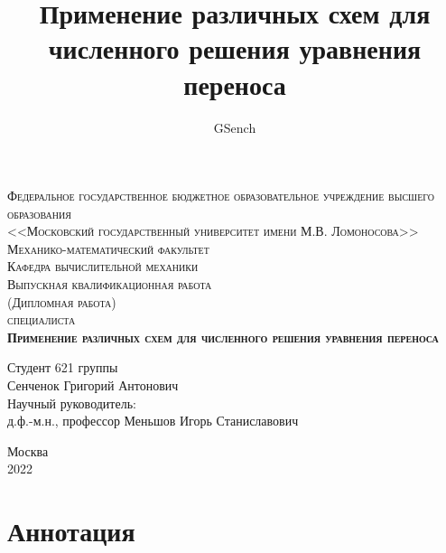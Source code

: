 \documentclass[10pt,a4paper]{article}
\author{GSench}
\title{Применение различных схем для численного решения уравнения переноса}
\begin{document}
\begin{titlepage}

\begin{center}
\textsc{Федеральное государственное бюджетное образовательное учреждение высшего образования\\
<<Московский государственный университет имени М.В. Ломоносова>>}\\
\vspace{12pt}
\textsc{Механико-математический факультет}\\
\textsc{Кафедра вычислительной механики}\\

\vspace*{\fill}
\textsc{Выпускная квалификационная работа\\
(Дипломная работа)\\
специалиста}\\
\vspace{12pt}
\textsc{\textbf{Применение различных схем для численного решения уравнения переноса}}\\
\vspace*{\fill}

\end{center}

\begin{flushright}
Студент 621 группы \\
Сенченок Григорий Антонович\\
\vspace{10pt}
Научный руководитель: \\
д.ф.-м.н., профессор Меньшов Игорь Станиславович
\end{flushright}

\mbox{}
\vfill
\begin{center}
Москва\\[5pt]
2022
\end{center}

\end{titlepage}

\tableofcontents


\newpage

\section{Аннотация}
\end{document}
